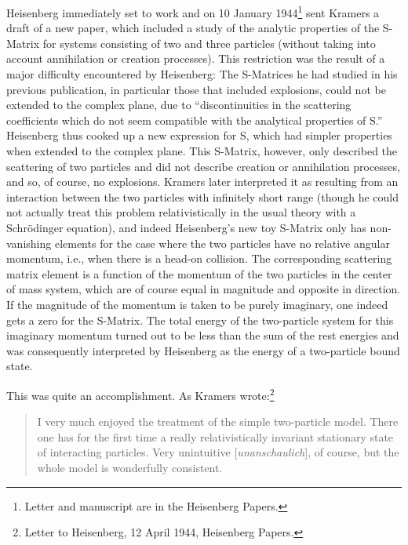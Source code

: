 \documentclass[12pt]{article}
\begin{document}
Heisenberg immediately set to work and on 10 January 1944\footnote{Letter and manuscript are in the Heisenberg Papers.} sent Kramers a draft of a new paper, which included a study of the analytic properties of the S-Matrix for systems consisting of two and three particles (without taking into account annihilation or creation processes). This restriction was the result of a major difficulty encountered by Heisenberg: The S-Matrices he had studied in his previous publication, in particular those that included explosions, could not be extended to the complex plane, due to ``discontinuities in the scattering coefficients which do not seem compatible with the analytical properties of S.'' Heisenberg thus cooked up a new expression for S, which had simpler properties when extended to the complex plane. This S-Matrix, however, only described the scattering of two particles and did not describe creation or annihilation processes, and so, of course, no explosions. Kramers later interpreted it as resulting from an interaction between the two particles with infinitely short range (though he could not actually treat this problem relativistically in the usual theory with a Schr\"{o}dinger equation), and indeed Heisenberg's new toy S-Matrix only has non-vanishing elements for the case where the two particles have no relative angular momentum, i.e., when there is a head-on collision. The corresponding scattering matrix element is a function of the momentum of the two particles in the center of mass system, which are of course equal in magnitude and opposite in direction. If the magnitude of the momentum is taken to be purely imaginary, one indeed gets a zero for the S-Matrix. The total energy of the two-particle system for this imaginary momentum turned out to be less than the sum of the rest energies and was consequently interpreted by Heisenberg as the energy of a two-particle bound state. 

This was quite an accomplishment. As Kramers wrote:\footnote{Letter to Heisenberg, 12 April 1944, Heisenberg Papers.}

\begin{quote}
I very much enjoyed the treatment of the simple two-particle model. There one has for the first time a really relativistically invariant stationary state of interacting particles. Very unintuitive [\emph{unanschaulich}], of course, but the whole model is wonderfully consistent.
\end{quote}
\end{document}
